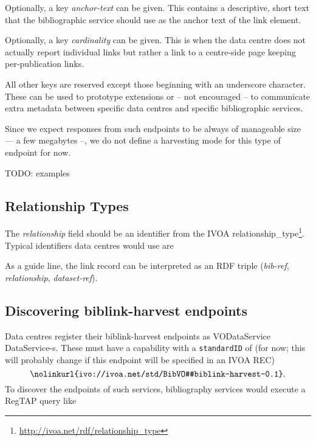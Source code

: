 \documentclass[11pt,a4paper]{ivoa}
\def\vocterm#1{\emph{\color{termcolor}#1}}
\def\vocterm{\startvocterm\realvocterm}
\def\realvocterm#1{\emph{\color{termcolor}#1}\endvocterm}
\gdef\breakablecolon{:\hskip0pt}
\gdef\startvocterm{\begingroup
  \catcode`\:=\active\let:=\breakablecolon}
\gdef\endvocterm{\endgroup}
\begin{document}
Optionally, a key \emph{anchor-text} can be given.  This contains a
descriptive, short text that the bibliographic service should use as
the anchor text of the link element.

Optionally, a key \emph{cardinality} can be given.  This is when the
data centre does not actually report individual links but rather a link
to a centre-side page keeping per-publication links.

All other keys are reserved except those beginning with an underscore
character.  These can be used to prototype extensions or -- not
encouraged -- to communicate extra metadata between specific data
centres and specific bibliographic services.

Since we expect responses from such endpoints to be always of manageable
size –– a few megabytes --, we do not define a harvesting mode for this
type of endpoint for now.

TODO: examples

\subsection{Relationship Types}

The \emph{relationship} field should be an identifier from the IVOA
relationship\_type\footnote{\url{http://ivoa.net/rdf/relationship_type}}.
Typical identifiers data centres would use are


As a guide line, the link record can be interpreted as an RDF triple
(\emph{bib-ref}, \emph{relationship}, \emph{dataset-ref}).


\subsection{Discovering biblink-harvest endpoints}

Data centres register their biblink-harvest endpoints as VODataService
\citep{2021ivoa.spec.1102D} DataService-s.  These must have a capability
with a \verb|standardID| of (for now; this will probably change if this
endpoint will be specified in an IVOA REC)
$$\hbox{\nolinkurl{ivo://ivoa.net/std/BibVO#biblink-harvest-0.1}}.$$
To discover the endpoints of such services, bibliography services would
execute a RegTAP query like
\end{document}
